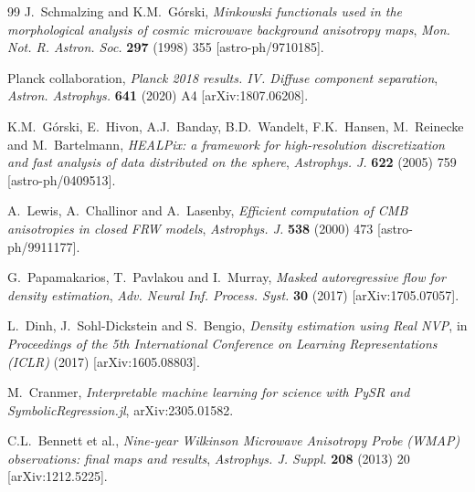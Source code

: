 \documentclass[a4paper,11pt]{article}
\begin{document}
\begin{thebibliography}{99}
J.~Schmalzing and K.M.~G\'orski, \emph{Minkowski functionals used in the morphological analysis of cosmic microwave background anisotropy maps}, \emph{Mon. Not. R. Astron. Soc.} {\bf 297} (1998) 355 [astro-ph/9710185].

Planck collaboration, \emph{Planck 2018 results. IV. Diffuse component separation}, \emph{Astron. Astrophys.} {\bf 641} (2020) A4 [arXiv:1807.06208].

K.M.~G\'orski, E.~Hivon, A.J.~Banday, B.D.~Wandelt, F.K.~Hansen, M.~Reinecke and M.~Bartelmann, \emph{HEALPix: a framework for high-resolution discretization and fast analysis of data distributed on the sphere}, \emph{Astrophys. J.} {\bf 622} (2005) 759 [astro-ph/0409513].

A.~Lewis, A.~Challinor and A.~Lasenby, \emph{Efficient computation of CMB anisotropies in closed FRW models}, \emph{Astrophys. J.} {\bf 538} (2000) 473 [astro-ph/9911177].

G.~Papamakarios, T.~Pavlakou and I.~Murray, \emph{Masked autoregressive flow for density estimation}, \emph{Adv. Neural Inf. Process. Syst.} {\bf 30} (2017) [arXiv:1705.07057].

L.~Dinh, J.~Sohl-Dickstein and S.~Bengio, \emph{Density estimation using Real NVP}, in \emph{Proceedings of the 5th International Conference on Learning Representations (ICLR)} (2017) [arXiv:1605.08803].

M.~Cranmer, \emph{Interpretable machine learning for science with PySR and SymbolicRegression.jl}, arXiv:2305.01582.

C.L.~Bennett et al., \emph{Nine-year Wilkinson Microwave Anisotropy Probe (WMAP) observations: final maps and results}, \emph{Astrophys. J. Suppl.} {\bf 208} (2013) 20 [arXiv:1212.5225].

\end{thebibliography}
\end{document}
